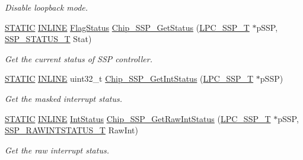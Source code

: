 \begin{DoxyCompactItemize}
\begin{DoxyCompactList}\small\item\em Disable loopback mode. \end{DoxyCompactList}\item 
\hyperlink{group__LPC__Types__Public__Macros_ga10b2d890d871e1489bb02b7e70d9bdfb}{S\-T\-A\-T\-I\-C} \hyperlink{group__LPC__Types__Public__Types_ga2eb6f9e0395b47b8d5e3eeae4fe0c116}{I\-N\-L\-I\-N\-E} \hyperlink{group__LPC__Types__Public__Types_ga89136caac2e14c55151f527ac02daaff}{Flag\-Status} \hyperlink{group__SSP__17XX__40XX_ga82dd278bcdbd80eaacc43abc211a970f}{Chip\-\_\-\-S\-S\-P\-\_\-\-Get\-Status} (\hyperlink{structLPC__SSP__T}{L\-P\-C\-\_\-\-S\-S\-P\-\_\-\-T} $\ast$p\-S\-S\-P, \hyperlink{group__SSP__17XX__40XX_gad95eaf4325a2ec8e457b309d21d6987d}{S\-S\-P\-\_\-\-S\-T\-A\-T\-U\-S\-\_\-\-T} Stat)
\begin{DoxyCompactList}\small\item\em Get the current status of S\-S\-P controller. \end{DoxyCompactList}\item 
\hyperlink{group__LPC__Types__Public__Macros_ga10b2d890d871e1489bb02b7e70d9bdfb}{S\-T\-A\-T\-I\-C} \hyperlink{group__LPC__Types__Public__Types_ga2eb6f9e0395b47b8d5e3eeae4fe0c116}{I\-N\-L\-I\-N\-E} uint32\-\_\-t \hyperlink{group__SSP__17XX__40XX_ga207244e33021333a66bb04f2bd2f1102}{Chip\-\_\-\-S\-S\-P\-\_\-\-Get\-Int\-Status} (\hyperlink{structLPC__SSP__T}{L\-P\-C\-\_\-\-S\-S\-P\-\_\-\-T} $\ast$p\-S\-S\-P)
\begin{DoxyCompactList}\small\item\em Get the masked interrupt status. \end{DoxyCompactList}\item 
\hyperlink{group__LPC__Types__Public__Macros_ga10b2d890d871e1489bb02b7e70d9bdfb}{S\-T\-A\-T\-I\-C} \hyperlink{group__LPC__Types__Public__Types_ga2eb6f9e0395b47b8d5e3eeae4fe0c116}{I\-N\-L\-I\-N\-E} \hyperlink{group__LPC__Types__Public__Types_gab7d263072f745b4f3913fb0afc434c4e}{Int\-Status} \hyperlink{group__SSP__17XX__40XX_ga0cc48f6c5bea491f2965b5b6fd0dcf69}{Chip\-\_\-\-S\-S\-P\-\_\-\-Get\-Raw\-Int\-Status} (\hyperlink{structLPC__SSP__T}{L\-P\-C\-\_\-\-S\-S\-P\-\_\-\-T} $\ast$p\-S\-S\-P, \hyperlink{group__SSP__17XX__40XX_gaf901cb9befcf9302650fed7f1ddba443}{S\-S\-P\-\_\-\-R\-A\-W\-I\-N\-T\-S\-T\-A\-T\-U\-S\-\_\-\-T} Raw\-Int)
\begin{DoxyCompactList}\small\item\em Get the raw interrupt status. \end{DoxyCompactList}\item 

\end{DoxyCompactItemize}

